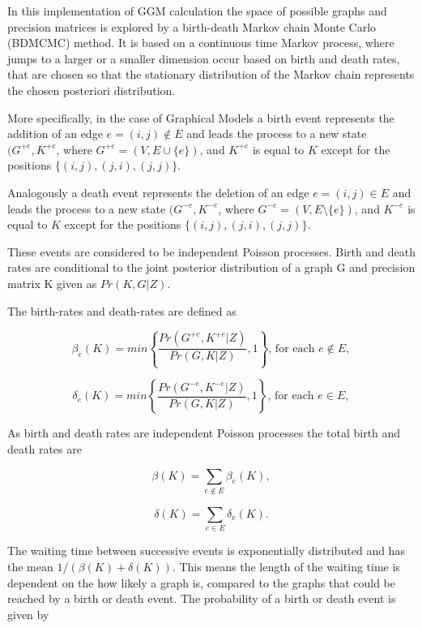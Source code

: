 \documentclass[a4paper,12pt,twoside,openright]{article}
\begin{document}
In this implementation of GGM calculation the space of possible graphs and precision matrices is explored by a birth-death Markov chain Monte Carlo (BDMCMC) method. It is based on a continuous time Markov process, where jumps to a larger or a smaller dimension occur based on birth and death rates, that are chosen so that the stationary distribution of the Markov chain represents the chosen posteriori distribution.

More specifically, in the case of Graphical Models a birth event represents the addition of an edge $e = (i,j) \notin E$ and leads the process to a new state $(G^{+e}, K^{+e}$, where $G^{+e} = (V, E \cup \{e\})$, and $K^{+e}$ is equal to $K$ except for the positions $\lbrace (i,j), (j,i), (j,j) \rbrace$.

Analogously a death event represents the deletion of an edge $e = (i,j) \in E$ and leads the process to a new state $(G^{-e}, K^{-e}$, where $G^{-e} = (V, E \setminus \{e\})$, and $K^{-e}$ is equal to $K$ except for the positions $\lbrace (i,j), (j,i), (j,j) \rbrace$.

These events are considered to be independent Poisson processes. Birth and death rates are conditional to the joint posterior distribution of a graph G and precision matrix K given as $Pr(K,G|Z)$.

The birth-rates and death-rates are defined as

\begin{equation}
\beta _e(K)=min\left\lbrace \frac{Pr(G^{+e}, K^{+e}|Z)}{Pr(G,K|Z)},1 \right\rbrace \text{, for each }  e \notin E,
\end{equation}

\begin{equation}
\delta _e(K)=min\left\lbrace \frac{Pr(G^{-e}, K^{-e}|Z)}{Pr(G,K|Z)},1 \right\rbrace \text{, for each }  e \in E,
\end{equation}

As birth and death rates are independent Poisson processes the total birth and death rates are

\begin{equation}
\beta(K) = \sum_{e \notin E}\beta_e(K),
\end{equation}
 
\begin{equation}
\delta(K) = \sum_{e \in E}\delta_e(K).
\end{equation}

The waiting time between successive events is exponentially distributed and has the mean $1/(\beta(K)+\delta(K))$. This means the length of the waiting time is dependent on the how likely a graph is, compared to the graphs that could be reached by a birth or death event. The probability of a birth or death event is given by
\end{document}
